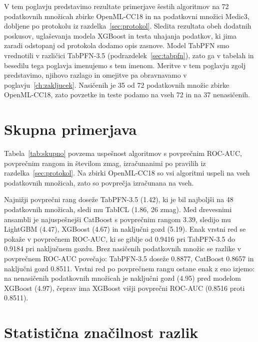 \documentclass[a4paper,12pt,openright]{book}
\begin{document}
V tem poglavju predstavimo rezultate primerjave šestih algoritmov na
72 podatkovnih množicah zbirke OpenML-CC18 in na podatkovni množici Medic3,
dobljene po protokolu iz razdelka~\ref{sec:protokol}. Sledita rezultata obeh
dodatnih poskusov, uglaševanja modela XGBoost in testa uhajanja podatkov, ki
jima zaradi odstopanj od protokola dodamo opis zasnove. Model TabPFN smo vrednotili v različici
TabPFN-3.5 (podrazdelek~\ref{sec:tabpfn}), zato ga v tabelah in besedilu tega
poglavja imenujemo s tem imenom. Meritve v tem poglavju zgolj predstavimo,
njihovo razlago in omejitve pa obravnavamo v poglavju~\ref{ch:zakljucek}.
Nasičenih je 35 od 72 podatkovnih množic zbirke OpenML-CC18, zato povzetke in
teste podamo na vseh 72 in na 37 nenasičenih.

\section{Skupna primerjava}
\label{sec:rez-skupno}

Tabela~\ref{tab:skupno} povzema uspešnost algoritmov s povprečnim ROC-AUC,
povprečnim rangom in številom zmag, izračunanimi po pravilih iz
razdelka~\ref{sec:protokol}. Na zbirki OpenML-CC18 so vsi algoritmi uspeli na
vseh podatkovnih množicah, zato so povprečja izračunana na vseh.

Najnižji povprečni rang doseže TabPFN-3.5 (\num{1.42}), ki je bil najboljši na
48 podatkovnih množicah, sledi mu TabICL (\num{1.86}, 26 zmag). Med drevesnimi
ansambli je najuspešnejši CatBoost s povprečnim rangom \num{3.39}, sledijo mu
LightGBM (\num{4.47}), XGBoost (\num{4.67}) in naključni gozd (\num{5.19}). Enak
vrstni red se pokaže v povprečnem ROC-AUC, ki se giblje od \num{0.9416} pri
TabPFN-3.5 do \num{0.9184} pri naključnem gozdu. Brez nasičenih podatkovnih
množic se razlike v povprečnem ROC-AUC povečajo: TabPFN-3.5 doseže \num{0.8877},
CatBoost \num{0.8657} in naključni gozd \num{0.8511}. Vrstni red po povprečnem
rangu ostane enak z eno izjemo: na nenasičenih podatkovnih množicah je naključni
gozd (\num{4.95}) pred modelom XGBoost (\num{4.97}), čeprav ima XGBoost višji
povprečni ROC-AUC (\num{0.8516} proti \num{0.8511}).


\FloatBarrier

\section{Statistična značilnost razlik}
\label{sec:rez-znacilnost}
\end{document}
